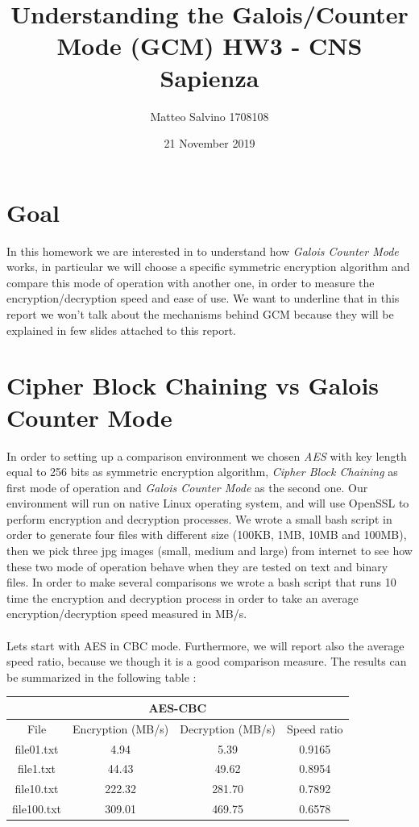\documentclass[11pt]{article}
\title{Understanding the Galois/Counter Mode (GCM) \large HW3 - CNS Sapienza}
\author{Matteo Salvino 1708108}
\date{21 November 2019}
\begin{document}
\maketitle
\section{Goal}
In this homework we are interested in to understand how \textit{Galois Counter Mode} works, in particular we will choose a specific symmetric encryption algorithm and compare this mode of operation with another one, in order to measure the encryption/decryption speed and ease of use. We want to underline that in this report we won't talk about the mechanisms behind  GCM because they will be explained in few slides attached to this report.
\section{Cipher Block Chaining vs Galois Counter Mode}
In order to setting up a comparison environment we chosen \textit{AES} with key length equal to 256 bits as symmetric encryption algorithm, \textit{Cipher Block Chaining} as first mode of operation and \textit{Galois Counter Mode} as the second one. Our environment will run on native Linux operating system, and will use OpenSSL to perform encryption and decryption processes. We wrote a small bash script in order to generate four files with different size (100KB, 1MB, 10MB and 100MB), then we pick three jpg images (small, medium and large) from internet to see how these two mode of operation behave when they are tested on text and binary files. In order to make several comparisons we wrote a bash script that runs 10 time the encryption and decryption process in order to take an average encryption/decryption speed measured in MB/s.\\\\Lets start with AES in CBC mode. Furthermore, we will report also the average speed ratio, because we though it is a good comparison measure. The results can be summarized in the following table :
\begin{center}
\begin{tabular}{| c | c | c | c |}
\hline
\multicolumn{4}{|c|}{AES-CBC} \\
\hline
File & Encryption (MB/s) & Decryption (MB/s) & Speed ratio\\
\hline
file01.txt & 4.94 & 5.39 & 0.9165 \\
\hline
file1.txt & 44.43 & 49.62 & 0.8954 \\
\hline
file10.txt & 222.32 & 281.70  & 0.7892 \\
\hline
file100.txt & 309.01 & 469.75 & 0.6578 \\
\hline
\end{tabular}
\end{center}
\end{document}
